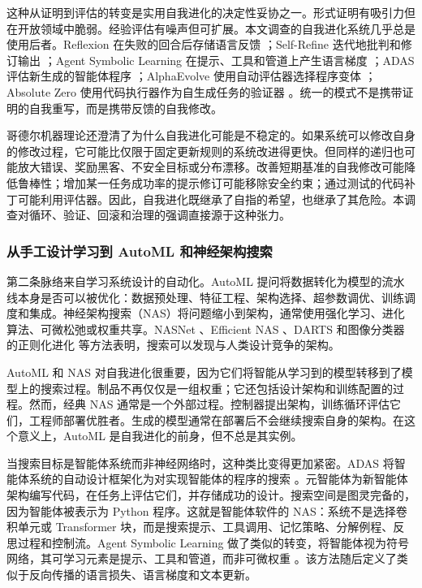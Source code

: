 这种从证明到评估的转变是实用自我进化的决定性妥协之一。形式证明有吸引力但在开放领域中脆弱。经验评估有噪声但可扩展。本文调查的自我进化系统几乎总是使用后者。Reflexion 在失败的回合后存储语言反馈 \cite{reflexion2023}；Self-Refine 迭代地批判和修订输出 \cite{selfrefine2023}；Agent Symbolic Learning 在提示、工具和管道上产生语言梯度 \cite{agentsymboliclearning2024}；ADAS 评估新生成的智能体程序 \cite{adas2025}；AlphaEvolve 使用自动评估器选择程序变体 \cite{alphaevolve2025}；Absolute Zero 使用代码执行器作为自生成任务的验证器 \cite{absolutezero2025}。统一的模式不是携带证明的自我重写，而是携带反馈的自我修改。

哥德尔机器理论还澄清了为什么自我进化可能是不稳定的。如果系统可以修改自身的修改过程，它可能比仅限于固定更新规则的系统改进得更快。但同样的递归也可能放大错误、奖励黑客、不安全目标或分布漂移。改善短期基准的自我修改可能降低鲁棒性；增加某一任务成功率的提示修订可能移除安全约束；通过测试的代码补丁可能利用评估器。因此，自我进化既继承了自指的希望，也继承了其危险。本调查对循环、验证、回滚和治理的强调直接源于这种张力。

\subsubsection{从手工设计学习到 AutoML 和神经架构搜索}

第二条脉络来自学习系统设计的自动化。AutoML 提问将数据转化为模型的流水线本身是否可以被优化：数据预处理、特征工程、架构选择、超参数调优、训练调度和集成。神经架构搜索（NAS）将问题缩小到架构，通常使用强化学习、进化算法、可微松弛或权重共享。NASNet \cite{zoph2018learning}、Efficient NAS \cite{pham2018efficient}、DARTS \cite{liu2018darts} 和图像分类器的正则化进化 \cite{real2019regularized} 等方法表明，搜索可以发现与人类设计竞争的架构。

AutoML 和 NAS 对自我进化很重要，因为它们将智能从学习到的模型转移到了模型上的搜索过程。制品不再仅仅是一组权重；它还包括设计架构和训练配置的过程。然而，经典 NAS 通常是一个外部过程。控制器提出架构，训练循环评估它们，工程师部署优胜者。生成的模型通常在部署后不会继续搜索自身的架构。在这个意义上，AutoML 是自我进化的前身，但不总是其实例。

当搜索目标是智能体系统而非神经网络时，这种类比变得更加紧密。ADAS 将智能体系统的自动设计框架化为对实现智能体的程序的搜索 \cite{adas2025}。元智能体为新智能体架构编写代码，在任务上评估它们，并存储成功的设计。搜索空间是图灵完备的，因为智能体被表示为 Python 程序。这就是智能体软件的 NAS：系统不是选择卷积单元或 Transformer 块，而是搜索提示、工具调用、记忆策略、分解例程、反思过程和控制流。Agent Symbolic Learning 做了类似的转变，将智能体视为符号网络，其可学习元素是提示、工具和管道，而非可微权重 \cite{agentsymboliclearning2024}。该方法随后定义了类似于反向传播的语言损失、语言梯度和文本更新。

